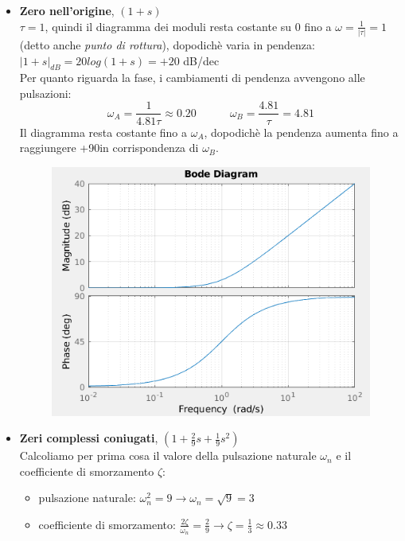 \documentclass[12pt,a4paper]{article}
\begin{document}
\begin{itemize}
\begin{figure}[h!]
		\end{figure}
		\item \textbf{Zero nell'origine}, $(1+s)$\vspace{5px}\\
		$\tau = 1$, quindi il diagramma dei moduli resta costante su 0 fino a $\omega = \frac{1}{|\tau|} = 1$ (detto anche \textit{punto di rottura}), dopodich\`e varia in pendenza:\\
		$|1+s|_{dB} = 20log(1+s) = +20$ dB/dec\\
		Per quanto riguarda la fase, i cambiamenti di pendenza avvengono alle pulsazioni:
		\[
			\omega_A = \frac{1}{4.81\tau}\approx0.20\quad\quad\quad\omega_B = \frac{4.81}{\tau} = 4.81
		\]
		Il diagramma resta costante fino a $\omega_A$, dopodich\`e la pendenza aumenta fino a raggiungere +90\degree in corrispondenza di $\omega_B$.
		\begin{figure}[h!]
			\centering
			\includegraphics[scale=0.5]{./images/bode45_3.png}
		\end{figure}
		\item \textbf{Zeri complessi coniugati}, $\left(1+\frac{2}{9}s + \frac{1}{9}s^2\right)$\vspace{5px}\\
		Calcoliamo per prima cosa il valore della pulsazione naturale $\omega_n$ e il coefficiente di smorzamento $\zeta$:
		\begin{itemize}
			\item pulsazione naturale: $\omega_n^2 = 9 \rightarrow \omega_n = \sqrt{9} = 3$
			\item coefficiente di smorzamento: $\frac{2\zeta}{\omega_n} = \frac{2}{9} \rightarrow \zeta = \frac{1}{3} \approx 0.33$

\end{itemize}
\end{itemize}
\end{document}
